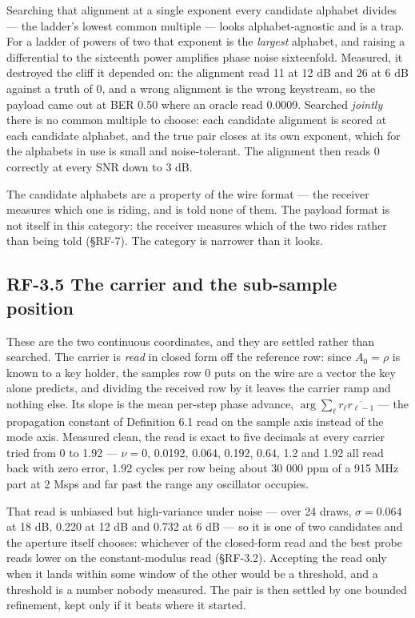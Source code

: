 \documentclass[10pt,letterpaper,twocolumn]{article}
\begin{document}
Searching that alignment at a single exponent every candidate alphabet divides --- the ladder's lowest common multiple --- looks alphabet-agnostic and is a trap. For a ladder of powers of two that exponent is the \emph{largest} alphabet, and raising a differential to the sixteenth power amplifies phase noise sixteenfold. Measured, it destroyed the cliff it depended on: the alignment read 11 at 12 dB and 26 at 6 dB against a truth of 0, and a wrong alignment is the wrong keystream, so the payload came out at BER 0.50 where an oracle read 0.0009. Searched \emph{jointly} there is no common multiple to choose: each candidate alignment is scored at each candidate alphabet, and the true pair closes at its own exponent, which for the alphabets in use is small and noise-tolerant. The alignment then reads 0 correctly at every SNR down to 3 dB.

The candidate alphabets are a property of the wire format --- the receiver measures which one is riding, and is told none of them. The payload format is not itself in this category: the receiver measures which of the two rides rather than being told (§RF-7). The category is narrower than it looks.

\subsection{RF-3.5 The carrier and the sub-sample position}\label{rf-35-the-carrier-and-the-sub-sample-position}

These are the two continuous coordinates, and they are settled rather than searched. The carrier is \emph{read} in closed form off the reference row: since \(A_0 = \rho\) is known to a key holder, the samples row 0 puts on the wire are a vector the key alone predicts, and dividing the received row by it leaves the carrier ramp and nothing else. Its slope is the mean per-step phase advance, \(\arg\sum_\ell r_\ell \overline{r_{\ell-1}}\) --- the propagation constant of Definition 6.1 read on the sample axis instead of the mode axis. Measured clean, the read is exact to five decimals at every carrier tried from 0 to 1.92 --- \(\nu = 0\), 0.0192, 0.064, 0.192, 0.64, 1.2 and 1.92 all read back with zero error, 1.92 cycles per row being about 30 000 ppm of a 915 MHz part at 2 Msps and far past the range any oscillator occupies.

That read is unbiased but high-variance under noise --- over 24 draws, \(\sigma = 0.064\) at 18 dB, 0.220 at 12 dB and 0.732 at 6 dB --- so it is one of two candidates and the aperture itself chooses: whichever of the closed-form read and the best probe reads lower on the constant-modulus read (§RF-3.2). Accepting the read only when it lands within some window of the other would be a threshold, and a threshold is a number nobody measured. The pair is then settled by one bounded refinement, kept only if it beats where it started.
\end{document}
